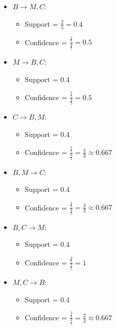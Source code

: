\documentclass[12pt,letterpaper, onecolumn]{exam}
\begin{document}
\begin{questions}
\begin{solution}
        \begin{itemize}
            \item \( B \rightarrow M, C \):
            \begin{itemize}
                \item Support = \( \frac{2}{5} = 0.4 \)
                \item Confidence = \( \frac{\frac{2}{5}}{\frac{4}{5}} = 0.5 \)
            \end{itemize}
            \item \( M \rightarrow B, C \):
            \begin{itemize}
                \item Support = 0.4
                \item Confidence = \( \frac{\frac{2}{5}}{\frac{4}{5}} = 0.5 \)
            \end{itemize}
            \item \( C \rightarrow B, M \):
            \begin{itemize}
                \item Support = 0.4
                \item Confidence = \( \frac{\frac{2}{5}}{\frac{3}{5}} = \frac{2}{3} \approx 0.667 \)
            \end{itemize}
            \item \( B, M \rightarrow C \):
            \begin{itemize}
                \item Support = 0.4
                \item Confidence = \( \frac{\frac{2}{5}}{\frac{3}{5}} = \frac{2}{3} \approx 0.667 \)
            \end{itemize}
            \item \( B, C \rightarrow M \):
            \begin{itemize}
                \item Support = 0.4
                \item Confidence = \( \frac{\frac{2}{5}}{\frac{2}{5}} = 1 \)
            \end{itemize}
            \item \( M, C \rightarrow B \):
            \begin{itemize}
                \item Support = 0.4
                \item Confidence = \( \frac{\frac{2}{5}}{\frac{3}{5}} = \frac{2}{3} \approx 0.667 \)
            \end{itemize}
        \end{itemize}
    \end{solution}


\end{questions}
\end{document}
